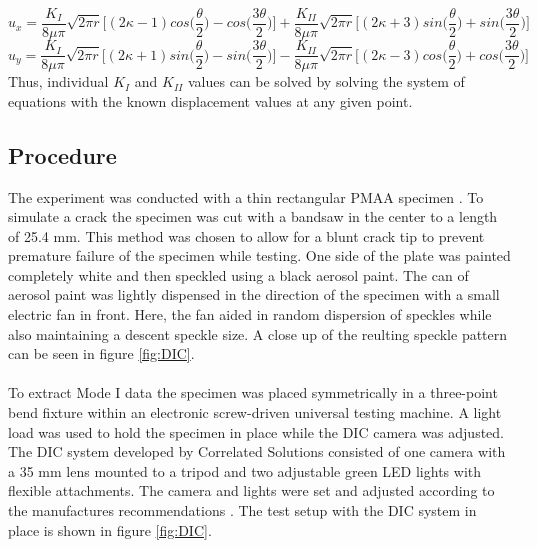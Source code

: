 \documentclass[12pt]{article}
\begin{document}
\begin{equation}
u_{x} = \frac{K_{I}}{8\mu \pi}\sqrt{2\pi r}\bigg[(2\kappa-1)cos\bigg(\frac{\theta}{2}\bigg)-cos\bigg(\frac{3\theta}{2}\bigg)\bigg] + \frac{K_{II}}{8\mu \pi}\sqrt{2\pi r}\bigg[(2\kappa+3)sin\bigg(\frac{\theta}{2}\bigg)+sin\bigg(\frac{3\theta}{2}\bigg)\bigg]
\end{equation}
\begin{equation}
u_{y} = \frac{K_{I}}{8\mu \pi}\sqrt{2\pi r}\bigg[(2\kappa+1)sin\bigg(\frac{\theta}{2}\bigg)-sin\bigg(\frac{3\theta}{2}\bigg)\bigg]-\frac{K_{II}}{8\mu \pi}\sqrt{2\pi r}\bigg[(2\kappa-3)cos\bigg(\frac{\theta}{2}\bigg)+cos\bigg(\frac{3\theta}{2}\bigg)\bigg]
\end{equation}
Thus, individual $K_{I}$ and $K_{II}$ values can be solved by solving the system of equations with the known displacement values at any given point.    
\subsection{Procedure} %
The experiment was conducted with a thin rectangular PMAA  specimen .  To simulate a crack the specimen was cut with a bandsaw in the center to a length of 25.4 mm. This  method was chosen to allow for a blunt crack tip to prevent premature failure of the specimen while testing.  One side of the plate was painted  completely white and then speckled using a black aerosol paint. The can of aerosol paint was lightly dispensed in the direction of the specimen with a small electric fan in front. Here, the fan aided in random dispersion of speckles while also maintaining a descent speckle size. A close up of the reulting speckle pattern can be seen in figure \ref{fig:DIC}. \\ \\

To extract Mode I data the  specimen was placed symmetrically in a three-point bend fixture within an electronic screw-driven universal testing machine. A light load was used to hold the specimen in place while the DIC camera was adjusted.
The DIC system developed by Correlated Solutions consisted of one camera with a 35 mm lens mounted to a tripod and two  adjustable green LED lights  with flexible attachments. The camera and lights were set and adjusted according to the manufactures recommendations \cite{DIC_Test}. The test setup with the DIC system in place is shown in figure \ref{fig:DIC}.\\
\\
\end{document}

